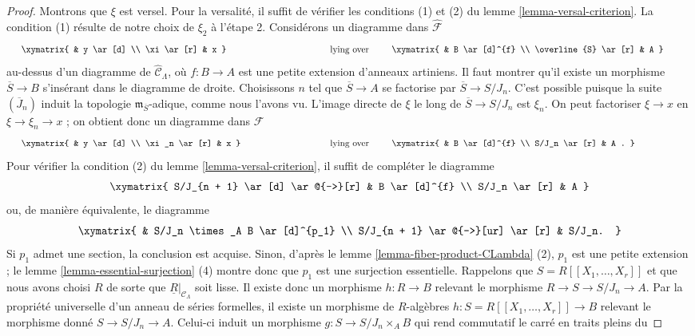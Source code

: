\begin{proof}
\medskip\noindent
Montrons que $\xi$ est versel. Pour la versalité, il suffit de vérifier les
conditions (1) et (2) du lemme \ref{lemma-versal-criterion}. La condition (1)
résulte de notre choix de $\xi_2$ à l'étape 2. Considérons un diagramme dans
$\widehat{\mathcal{F}}$
$$
\vcenter{
\xymatrix{
            &  y \ar[d] \\
\xi \ar[r]  &  x
}
}
\quad\text{lying over}\quad
\vcenter{
\xymatrix{
         &   B  \ar[d]^{f} \\
\overline{S} \ar[r] &   A
}
}
$$
au-dessus d'un diagramme de $\widehat{\mathcal{C}}_\Lambda$, où
$f: B \to A$ est une petite extension d'anneaux artiniens. Il faut montrer
qu'il existe un morphisme $\overline{S} \to B$ s'insérant dans le
diagramme de droite. Choisissons $n$ tel que $\overline{S} \to A$ se
factorise par $\overline{S} \to S/J_n$. C'est possible puisque la suite
$(\overline{J}_n)$ induit la topologie $\mathfrak m_{\overline{S}}$-adique,
comme nous l'avons vu. L'image directe de $\xi$ le long de
$\overline{S} \to S/J_n$ est $\xi_n$. On peut factoriser $\xi \to x$ en
$\xi \to \xi_n \to x$ ; on obtient donc un diagramme dans $\mathcal{F}$
$$
\vcenter{
\xymatrix{
            &  y \ar[d] \\
\xi_n \ar[r]  &  x
}
}
\quad\text{lying over}\quad
\vcenter{
\xymatrix{
         &   B  \ar[d]^{f} \\
S/J_n \ar[r] &   A .
}
}
$$
Pour vérifier la condition (2) du lemme \ref{lemma-versal-criterion}, il
suffit de compléter le diagramme
$$
\xymatrix{
S/J_{n + 1} \ar[d] \ar@{-->}[r] & B \ar[d]^{f} \\
S/J_n   \ar[r] & A
}
$$
ou, de manière équivalente, le diagramme
$$
\xymatrix{
  &  S/J_n \times_A B \ar[d]^{p_1} \\
S/J_{n + 1} \ar@{-->}[ur] \ar[r] &  S/J_n.
}
$$
Si $p_1$ admet une section, la conclusion est acquise. Sinon, d'après le lemme
\ref{lemma-fiber-product-CLambda} (2), $p_1$ est une petite extension ; le
lemme \ref{lemma-essential-surjection} (4) montre donc que $p_1$ est une
surjection essentielle. Rappelons que $S = R[[X_1, \ldots, X_r]]$ et que
nous avons choisi $R$ de sorte que
$\underline{R}|_{\mathcal{C}_\Lambda}$ soit lisse. Il existe donc un
morphisme $h : R \to B$ relevant le morphisme
$R \to S \to S/J_n \to A$. Par la propriété universelle d'un anneau de
séries formelles, il existe un morphisme de $R$-algèbres
$h : S = R[[X_1, \ldots, X_r]] \to B$ relevant le morphisme donné
$S \to S/J_n \to A$. Celui-ci induit un morphisme
$g: S \to S/J_n \times_A B$ qui rend commutatif le carré en traits pleins du

\end{proof}
